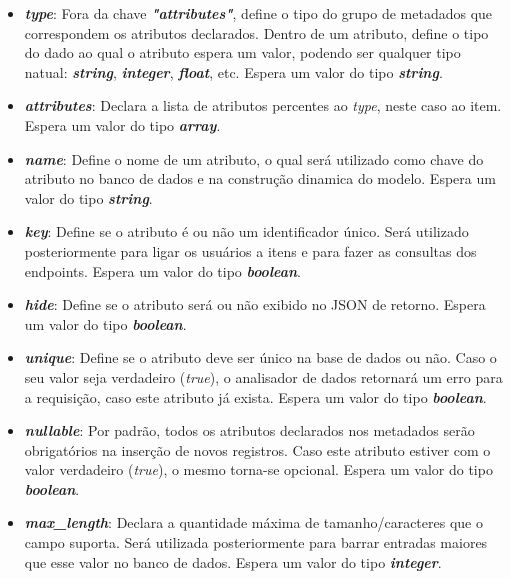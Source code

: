 \documentclass[12pt, openright, oneside, a4paper, brazil]{abntex2}
\begin{document}
\begin{itemize}
	\item \textbf{\textit{type}}: Fora da chave \textbf{\textit{"attributes"}}, define o tipo do grupo de metadados que correspondem os atributos declarados. Dentro de um atributo, define o tipo do dado ao qual o atributo espera um valor, podendo ser qualquer tipo natual: \textbf{\textit{string}}, \textbf{\textit{integer}}, \textbf{\textit{float}}, etc. Espera um valor do tipo \textbf{\textit{string}}.
	
	\item \textbf{\textit{attributes}}: Declara a lista de atributos percentes ao \textit{type}, neste caso ao item.  Espera um valor do tipo \textbf{\textit{array}}.
	
	\item \textbf{\textit{name}}: Define o nome de um atributo, o qual será utilizado como chave do atributo no banco de dados e na construção dinamica do modelo. Espera um valor do tipo \textbf{\textit{string}}.

	\item \textbf{\textit{key}}: Define se o atributo é ou não um identificador único. Será utilizado posteriormente para ligar os usuários a itens e para fazer as consultas dos endpoints.  Espera um valor do tipo \textbf{\textit{boolean}}.
	
	\item \textbf{\textit{hide}}: Define se o atributo será ou não exibido no JSON de retorno. Espera um valor do tipo \textbf{\textit{boolean}}.

	\item \textbf{\textit{unique}}: Define se o atributo deve ser único na base de dados ou não. Caso o seu valor seja verdadeiro (\textit{true}), o analisador de dados retornará um erro para a requisição, caso este atributo já exista. Espera um valor do tipo \textbf{\textit{boolean}}.

	\item \textbf{\textit{nullable}}: Por padrão, todos os atributos declarados nos metadados serão obrigatórios na inserção de novos registros. Caso este atributo estiver com o valor verdadeiro (\textit{true}), o mesmo torna-se opcional. Espera um valor do tipo \textbf{\textit{boolean}}.

	\item \textbf{\textit{max\_length}}: Declara a quantidade máxima de tamanho/caracteres que o campo suporta. Será utilizada posteriormente para barrar entradas maiores que esse valor no banco de dados. Espera um valor do tipo \textbf{\textit{integer}}.


\end{itemize}
\end{document}
